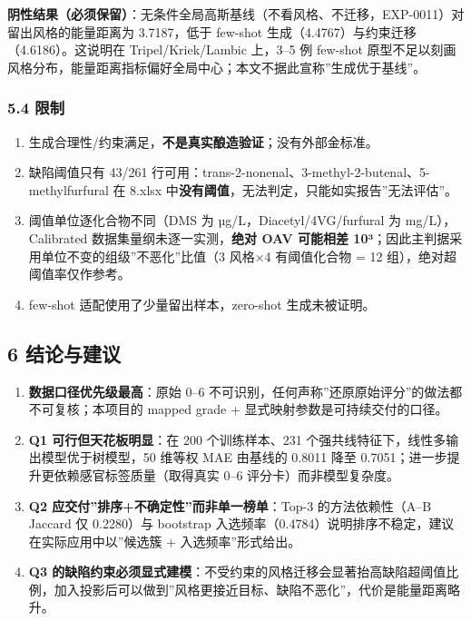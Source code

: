 \documentclass[
  UTF8]{ctexart}
\newcounter{none} %
\providecommand{\tightlist}{%
  \setlength{\itemsep}{0pt}\setlength{\parskip}{0pt}}
\begin{document}
\textbf{阴性结果（必须保留）}：无条件全局高斯基线（不看风格、不迁移，EXP-0011）对留出风格的能量距离为
3.7187，低于 few-shot 生成（4.4767）与约束迁移（4.6186）。这说明在
Tripel/Kriek/Lambic 上，3--5 例 few-shot
原型不足以刻画风格分布，能量距离指标偏好全局中心；本文不据此宣称''生成优于基线''。

\subsubsection{5.4 限制}\label{ux9650ux5236-1}

\begin{enumerate}
\def\labelenumi{\arabic{enumi}.}
\tightlist
\item
  生成合理性/约束满足，\textbf{不是真实酿造验证}；没有外部金标准。
\item
  缺陷阈值只有 43/261
  行可用：trans-2-nonenal、3-methyl-2-butenal、5-methylfurfural 在
  8.xlsx 中\textbf{没有阈值}，无法判定，只能如实报告''无法评估''。
\item
  阈值单位逐化合物不同（DMS 为 µg/L，Diacetyl/4VG/furfural 为
  mg/L），Calibrated 数据集量纲未逐一实测，\textbf{绝对 OAV 可能相差
  10³}；因此主判据采用单位不变的组级''不恶化''比值（3 风格×4
  有阈值化合物 = 12 组），绝对超阈值率仅作参考。
\item
  few-shot 适配使用了少量留出样本，zero-shot 生成未被证明。
\end{enumerate}

\subsection{6 结论与建议}\label{ux7ed3ux8bbaux4e0eux5efaux8bae}

\begin{enumerate}
\def\labelenumi{\arabic{enumi}.}
\tightlist
\item
  \textbf{数据口径优先级最高}：原始 0--6
  不可识别，任何声称''还原原始评分''的做法都不可复核；本项目的 mapped
  grade + 显式映射参数是可持续交付的口径。
\item
  \textbf{Q1 可行但天花板明显}：在 200 个训练样本、231
  个强共线特征下，线性多输出模型优于树模型，50 维等权 MAE 由基线的
  0.8011 降至 0.7051；进一步提升更依赖感官标签质量（取得真实 0--6
  评分卡）而非模型复杂度。
\item
  \textbf{Q2 应交付''排序+不确定性''而非单一榜单}：Top-3
  的方法依赖性（A--B Jaccard 仅 0.2280）与 bootstrap
  入选频率（0.4784）说明排序不稳定，建议在实际应用中以''候选簇 +
  入选频率''形式给出。
\item
  \textbf{Q3
  的缺陷约束必须显式建模}：不受约束的风格迁移会显著抬高缺陷超阈值比例，加入投影后可以做到''风格更接近目标、缺陷不恶化''，代价是能量距离略升。
\end{enumerate}
\end{document}
